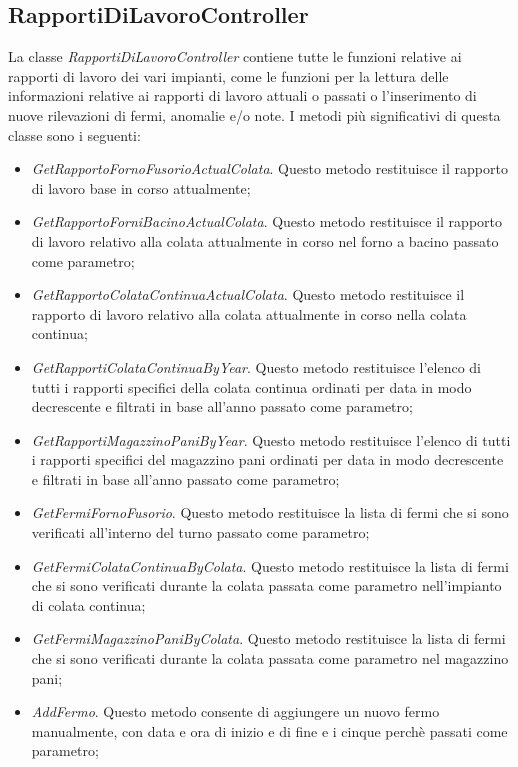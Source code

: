   \subsection{RapportiDiLavoroController}
  La classe \textit{RapportiDiLavoroController} contiene tutte le funzioni relative ai rapporti di lavoro dei vari impianti,
  come le funzioni per la lettura delle informazioni relative ai rapporti di lavoro attuali o passati o l'inserimento di nuove
  rilevazioni di fermi, anomalie e/o note. I metodi più significativi
  di questa classe sono i seguenti:
  \begin{itemize}
    \item \textit{GetRapportoFornoFusorioActualColata}. Questo metodo restituisce il rapporto di lavoro base in
    corso attualmente;
    \item \textit{GetRapportoForniBacinoActualColata}. Questo metodo restituisce il rapporto di lavoro relativo alla
    colata attualmente in corso nel forno a bacino passato come parametro;
    \item \textit{GetRapportoColataContinuaActualColata}. Questo metodo restituisce il rapporto di lavoro relativo
    alla colata attualmente in corso nella colata continua;
    \item \textit{GetRapportiColataContinuaByYear}. Questo metodo restituisce l'elenco di tutti i rapporti specifici
    della colata continua ordinati per data in modo decrescente e filtrati in base all'anno passato come parametro;
    \item \textit{GetRapportiMagazzinoPaniByYear}. Questo metodo restituisce l'elenco di tutti i rapporti specifici
    del magazzino pani ordinati per data in modo decrescente e filtrati in base all'anno passato come parametro;
    \item \textit{GetFermiFornoFusorio}. Questo metodo restituisce la lista di fermi che si sono verificati
    all'interno del turno passato come parametro;
    \item \textit{GetFermiColataContinuaByColata}. Questo metodo restituisce la lista di fermi che si sono
    verificati durante la colata passata come parametro nell'impianto di colata continua;
    \item \textit{GetFermiMagazzinoPaniByColata}. Questo metodo restituisce la lista di fermi che si sono
    verificati durante la colata passata come parametro nel magazzino pani;
    \item \textit{AddFermo}. Questo metodo consente di aggiungere un nuovo fermo manualmente, con data e ora
    di inizio e di fine e i cinque perchè passati come parametro;

\end{itemize}
